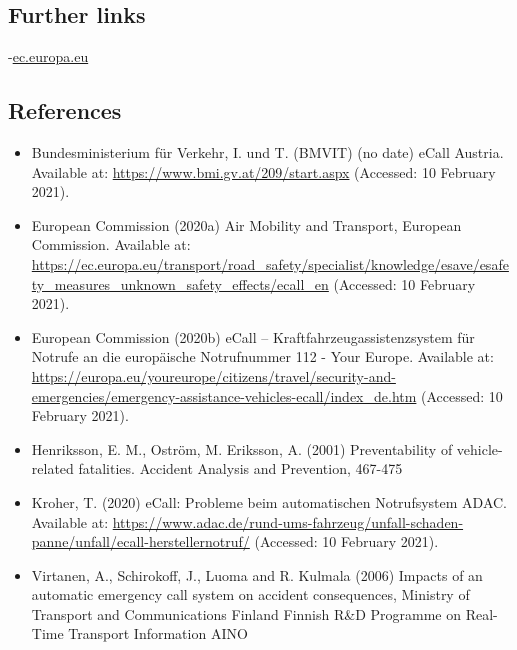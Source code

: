 \documentclass[
]{book}
\providecommand{\tightlist}{%
  \setlength{\itemsep}{0pt}\setlength{\parskip}{0pt}}
\begin{document}
\hypertarget{further-links-13}{%
\subsection*{Further links}\label{further-links-13}}

-\href{https://ec.europa.eu/transport/road_safety/specialist/knowledge/esave/esafety_measures_unknown_safety_effects/ecall_en}{ec.europa.eu}

\hypertarget{references-16}{%
\subsection*{References}\label{references-16}}

\begin{itemize}
\tightlist
\item
  Bundesministerium für Verkehr, I. und T. (BMVIT) (no date) eCall Austria. Available at: \url{https://www.bmi.gv.at/209/start.aspx} (Accessed: 10 February 2021).
\item
  European Commission (2020a) Air \textbar{} Mobility and Transport, European Commission. Available at: \url{https://ec.europa.eu/transport/road_safety/specialist/knowledge/esave/esafety_measures_unknown_safety_effects/ecall_en} (Accessed: 10 February 2021).
\item
  European Commission (2020b) eCall -- Kraftfahrzeugassistenzsystem für Notrufe an die europäische Notrufnummer 112 - Your Europe. Available at: \url{https://europa.eu/youreurope/citizens/travel/security-and-emergencies/emergency-assistance-vehicles-ecall/index_de.htm} (Accessed: 10 February 2021).
\item
  Henriksson, E. M., Oström, M. Eriksson, A. (2001) Preventability of vehicle-related fatalities. Accident Analysis and Prevention, 467-475
\item
  Kroher, T. (2020) eCall: Probleme beim automatischen Notrufsystem \textbar{} ADAC. Available at: \url{https://www.adac.de/rund-ums-fahrzeug/unfall-schaden-panne/unfall/ecall-herstellernotruf/} (Accessed: 10 February 2021).
\item
  Virtanen, A., Schirokoff, J., Luoma and R. Kulmala (2006) Impacts of an automatic emergency call system on accident consequences, Ministry of Transport and Communications Finland Finnish R\&D Programme on Real-Time Transport Information AINO
\end{itemize}
\end{document}
